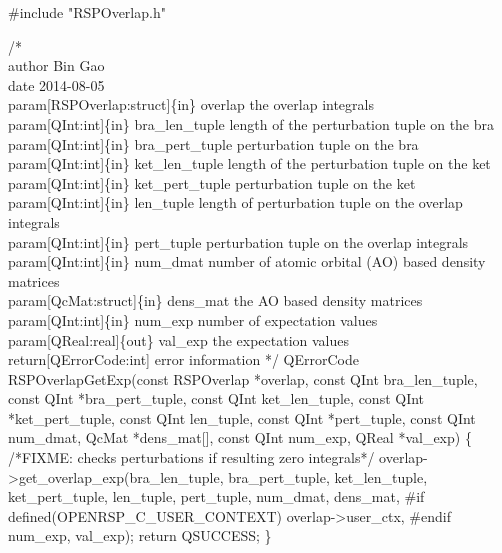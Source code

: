 #include "RSPOverlap.h"

/*%
    \\author Bin Gao
    \\date 2014-08-05
    \\param[RSPOverlap:struct]\{in\} overlap the overlap integrals
    \\param[QInt:int]\{in\} bra_len_tuple length of the perturbation tuple on the bra
    \\param[QInt:int]\{in\} bra_pert_tuple perturbation tuple on the bra
    \\param[QInt:int]\{in\} ket_len_tuple length of the perturbation tuple on the ket
    \\param[QInt:int]\{in\} ket_pert_tuple perturbation tuple on the ket
    \\param[QInt:int]\{in\} len_tuple length of perturbation tuple on the overlap integrals
    \\param[QInt:int]\{in\} pert_tuple perturbation tuple on the overlap integrals
    \\param[QInt:int]\{in\} num_dmat number of atomic orbital (AO) based density matrices
    \\param[QcMat:struct]\{in\} dens_mat the AO based density matrices
    \\param[QInt:int]\{in\} num_exp number of expectation values
    \\param[QReal:real]\{out\} val_exp the expectation values
    \\return[QErrorCode:int] error information
*/
QErrorCode RSPOverlapGetExp(const RSPOverlap *overlap,
                            const QInt bra_len_tuple,
                            const QInt *bra_pert_tuple,
                            const QInt ket_len_tuple,
                            const QInt *ket_pert_tuple,
                            const QInt len_tuple,
                            const QInt *pert_tuple,
                            const QInt num_dmat,
                            QcMat *dens_mat[],
                            const QInt num_exp,
                            QReal *val_exp)
\{
/*FIXME: checks perturbations if resulting zero integrals*/
    overlap->get_overlap_exp(bra_len_tuple,
                             bra_pert_tuple,
                             ket_len_tuple,
                             ket_pert_tuple,
                             len_tuple,
                             pert_tuple,
                             num_dmat,
                             dens_mat,
#if defined(OPENRSP_C_USER_CONTEXT)
                             overlap->user_ctx,
#endif
                             num_exp,
                             val_exp);
    return QSUCCESS;
\}

